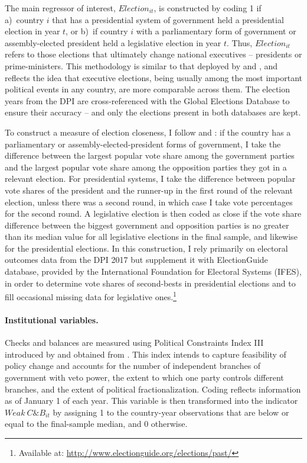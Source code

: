 \documentclass[12pt,a4paper]{article}
\begin{document}
The main regressor of interest, $Election_{it}$, is constructed by coding 1 if a)~country $i$ that has a presidential system of government held a presidential election in year $t$, or b)~if country $i$ with a parliamentary form of government or assembly-elected president held a legislative election in year $t$. Thus, $Election_{it}$ refers to those elections that ultimately change national executives -- presidents or prime-ministers. This methodology is similar to that deployed by \citet{julio2012political} and \citet{li2018national}, and reflects the idea that executive elections, being usually among the most important political events in any country, are more comparable across them. The election years from the DPI are cross-referenced with the Global Elections Database to ensure their accuracy -- and only the elections present in both databases are kept. \nocite{brancati2014global}

To construct a measure of election closeness, I follow \citet{julio2012political} and \citet{durnev2010real}: if the country has a parliamentary or assembly-elected-president forms of government, I take the difference between the largest popular vote share among the government parties and the largest popular vote share among the opposition parties they got in a relevant election. For presidential systems, I take the difference between popular vote shares of the president and the runner-up in the first round of the relevant election, unless there was a second round, in which case I take vote percentages for the second round. A legislative election is then coded as close if the vote share difference between the biggest government and opposition parties is no greater than its median value for all legislative elections in the final sample, and likewise for the presidential elections. In this construction, I rely primarily on electoral outcomes data from the DPI 2017 but supplement it with ElectionGuide database, provided by the International Foundation for Electoral Systems (IFES), in order to determine vote shares of second-bests in presidential elections and to fill occasional missing data for legislative ones.\footnote{Available at: \url{http://www.electionguide.org/elections/past/}}

\paragraph{Institutional variables.}
Checks and balances are measured using Political Constraints Index III introduced by \citet{henisz2002} and obtained from \cite{qogdata}. This index intends to capture feasibility of policy change and accounts for the number of independent branches of government with veto power, the extent to which one party controls different branches, and the extent of political fractionalization. Coding reflects information as of January 1 of each year. This variable is then transformed into the indicator $Weak\ C\&B_	{it}$ by assigning 1 to the country-year observations that are below or equal to the final-sample median, and 0 otherwise.
\end{document}
